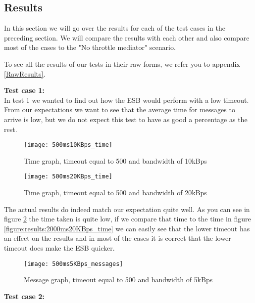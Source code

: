 \subsection{Results}\label{Testing:Results}
	In this section we will go over the results for each of the test cases in the preceding section. We will compare the results with each other and also compare most of the cases to the "No throttle mediator" scenario.
	
	\begin{shaded}
	To see all the results of our tests in their raw forms, we refer you to appendix \ref{RawResults}.
	\end{shaded}
	 
    \textbf{Test case 1:}\\
    In test 1 we wanted to find out how the ESB would perform with a low timeout. From our expectations we want to see that the average time for messages to arrive is low, but we do not expect this test to have as good a percentage as the rest. 
    
	\begin{figure}[H]
		\centering
		\texttt{[image: 500ms10KBps\_time]}
		\caption{Time graph, timeout equal to 500 and bandwidth of 10kBps} 
		\label{figure:results:500ms10KBps_time}
	\end{figure}
	
	\begin{figure}[H]
		\centering
		\texttt{[image: 500ms20KBps\_time]}
		\caption{Time graph, timeout equal to 500 and bandwidth of 20kBps} 
		\label{figure:results:500ms20KBps_time}
	\end{figure}
    
    The actual results do indeed match our expectation quite well. As you can see in figure \ref{figure:results:500ms20KBps_time} the time taken is quite low, if we compare that time to the time in figure \ref{figure:results:2000ms20KBps_time} we can easily see that the lower timeout has an effect on the results and in most of the cases it is correct that the lower timeout does make the ESB quicker.
    
    \begin{figure}[H]
		\centering
		\texttt{[image: 500ms5KBps\_messages]}
		\caption{Message graph, timeout equal to 500 and bandwidth of 5kBps} 
		\label{figure:results:500ms5KBps_messages}
	\end{figure}
    
    \textbf{Test case 2:}\\
    
